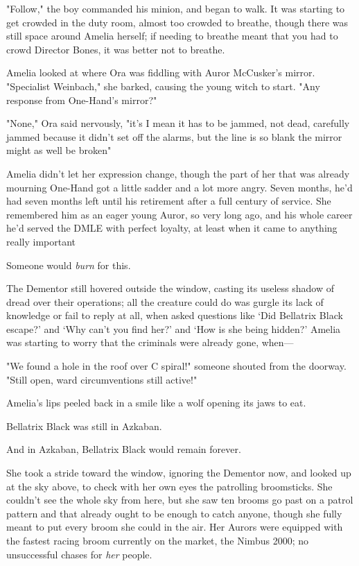 "Follow," the boy commanded his minion, and began to walk.
\sbreak
It was starting to get crowded in the duty room, almost too crowded to breathe,
though there was still space around Amelia herself; if needing to breathe meant
that you had to crowd Director Bones, it was better not to breathe.

Amelia looked at where Ora was fiddling with Auror McCusker's mirror.
"Specialist Weinbach," she barked, causing the young witch to start. "Any
response from One-Hand's mirror?"

"None," Ora said nervously, "it's{\el} I mean it has to be jammed, not dead,
carefully jammed because it didn't set off the alarms, but the line is so blank
the mirror might as well be broken{\el}"

Amelia didn't let her expression change, though the part of her that was
already mourning One-Hand got a little sadder and a lot more angry. Seven
months, he'd had seven months left until his retirement after a full century of
service. She remembered him as an eager young Auror, so very long ago, and his
whole career he'd served the DMLE with perfect loyalty, at least when it came
to anything really important{\el}

Someone would \emph{burn} for this.

The Dementor still hovered outside the window, casting its useless shadow of
dread over their operations; all the creature could do was gurgle its lack of
knowledge or fail to reply at all, when asked questions like `Did Bellatrix
Black escape?' and `Why can't you find her?' and `How is she being hidden?'
Amelia was starting to worry that the criminals were already gone, when---

"We found a hole in the roof over C spiral!" someone shouted from the doorway.
"Still open, ward circumventions still active!"

Amelia's lips peeled back in a smile like a wolf opening its jaws to eat.

Bellatrix Black was still in Azkaban.

And in Azkaban, Bellatrix Black would remain forever.

She took a stride toward the window, ignoring the Dementor now, and looked up
at the sky above, to check with her own eyes the patrolling broomsticks. She
couldn't see the whole sky from here, but she saw ten brooms go past on a
patrol pattern and that already ought to be enough to catch anyone, though she
fully meant to put every broom she could in the air. Her Aurors were equipped
with the fastest racing broom currently on the market, the Nimbus 2000; no
unsuccessful chases for \emph{her} people.

